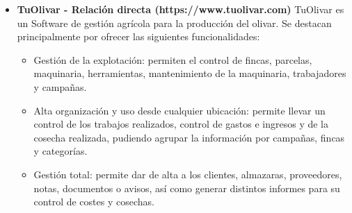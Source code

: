 \begin{itemize}
    Como hemos comentado, AgriCloud está pensada para poder satisfacer las necesidades de varios sectores:
    \begin{itemize}
        \item Agricultores individuales: podrán registrar en cuestión de segundos sus tareas pendientes o realizadas,
        llevarán un control de costes e ingresos por cultivo (sabiendo cuánto cuesta y cuánto produce por cada parcela)
        y podrán generar informes de forma automática.
        \item Cooperativas y asociaciones: destaca por aportar funcionales como el registro y consulta de la información
        de cada miembro y su producción, supervisión en tiempo real de cada tarea y de los resultados de la campaña,
        generación de informes globales o por socio en PDF o Excel, permite la comunicación y coordinación entre el 
        personal a través de un entorno digital único.
        \item Empresas de servicios agrícolas: las empresas podrán gestionar partes digitales por cliente o finca, 
        convertir dichos partes en facturas electrónicas al instante, control de maquinaria y materiales (horas y costes
        asociados a cada servicio o cliente), ayuda en la toma decisión gracias a la consulta de resultados por tipo de 
        trabajo y campañas.
        \item Trabajadores por campaña: AgriCloud ofrece una gestión de las ``cuadrillas`` de trabajadores a través de un 
        fichaje y control del horario digital, asignación por tareas por finca o cultivo, accesos personalizados (cada perfil
        está adaptado al rol del empleado) y ofrece un seguimiento en la nube, consiguiendo que toda la información se 
        sincronice automáticamente.
    \end{itemize}

    \item \textbf{TuOlivar - Relación directa (https://www.tuolivar.com)}
    \newline
    TuOlivar es un Software de gestión agrícola para la producción del olivar. Se destacan principalmente por ofrecer las
    siguientes funcionalidades:
    \begin{itemize}
        \item Gestión de la explotación: permiten el control de fincas, parcelas, maquinaria, herramientas, mantenimiento
        de la maquinaria, trabajadores y campañas.
        \item Alta organización y uso desde cualquier ubicación: permite llevar un control de los trabajos realizados, control
        de gastos e ingresos y de la cosecha realizada, pudiendo agrupar la información por campañas, fincas y categorías.
        \item Gestión total: permite dar de alta a los clientes, almazaras, proveedores, notas, documentos o avisos, así como
        generar distintos informes para su control de costes y cosechas.
    \end{itemize}
    

\end{itemize}
